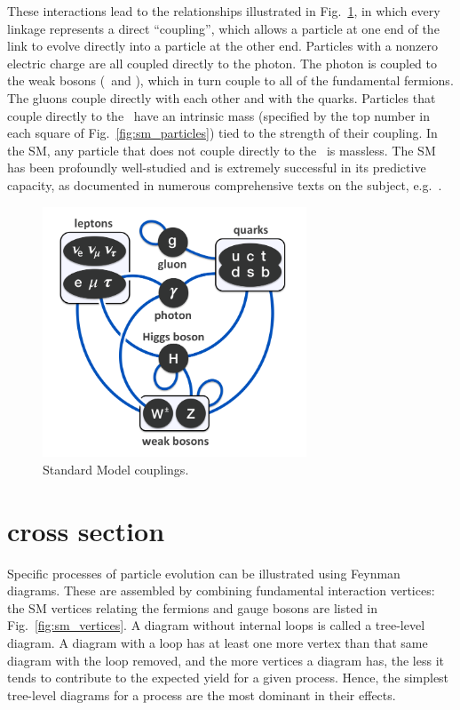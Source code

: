 \documentclass[oneside, letterpaper, 12pt, oldfontcommands]{memoir}
\begin{document}
These interactions lead to the relationships illustrated in Fig.~\ref{fig:sm_interactions}, in which every linkage represents
a direct ``coupling'', which allows a particle at one end of the link to evolve directly into a particle at the other end.
Particles with a nonzero electric charge are all coupled directly to the photon. The photon is coupled to the weak bosons
(\PZ\ and \PW), which in turn couple to all of the fundamental fermions.
The gluons couple directly with each other and with the quarks.
Particles that couple directly to the \PH\ have an intrinsic mass (specified by the top number in each square of Fig.~\ref{fig:sm_particles})
tied to the strength of their coupling. In the SM, any particle that does not couple directly to the \PH\ is massless.
The SM has been profoundly well-studied and is extremely successful in its predictive capacity, as documented in numerous comprehensive
texts on the subject, e.g.~\cite{ref:HalzenMartin, ref:PDG}.

\begin{figure}[hbtp]
  \begin{center}
    \includegraphics[width=0.7\textwidth]{Figures/Elementary_particle_interactions_in_the_Standard_Model.png}
    \caption{
      Standard Model couplings.
    }
    \label{fig:sm_interactions}
  \end{center}
\end{figure}

\section{ cross section} \label{sec:introduction_znng}
Specific processes of particle evolution can be illustrated using Feynman diagrams. These are
assembled by combining fundamental interaction vertices: the SM vertices relating the fermions and gauge bosons are listed in Fig.~\ref{fig:sm_vertices}.
A diagram without internal loops is called a tree-level diagram. A diagram with a loop has at least one more vertex than that same
diagram with the loop removed, and the more vertices a diagram has, the less it tends to contribute to the expected yield for a
given process. Hence, the simplest tree-level diagrams for a process are the most dominant in their effects.
\end{document}
